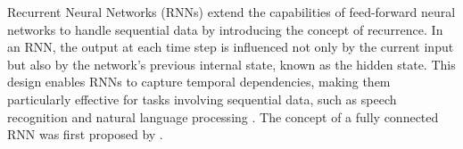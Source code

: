 \documentclass[12pt, a4paper, headinclude, twoside, plainheadsepline, open=right, numbers=noenddot, hidelinks, toc=listof, toc=bibliography]{scrreprt}
\begin{document}
Recurrent Neural Networks (RNNs) extend the capabilities of feed-forward neural networks to handle sequential data by introducing the concept of recurrence. In an RNN, the output at each time step is influenced not only by the current input but also by the network's previous internal state, known as the hidden state. This design enables RNNs to capture temporal dependencies, making them particularly effective for tasks involving sequential data, such as speech recognition and natural language processing \cite{lecunDeepLearning2015}.
%
%
%
%
%
%
The concept of a fully connected RNN was first proposed by \citeauthor{elmanFindingStructureTime1990} \cite{elmanFindingStructureTime1990}.
\end{document}
